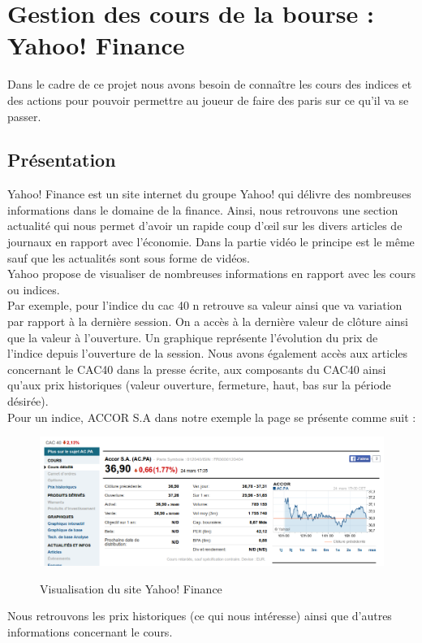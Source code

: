 \section{Gestion des cours de la bourse : Yahoo! Finance}

Dans le cadre de ce projet nous avons besoin de connaître les cours des indices et des actions pour pouvoir permettre au joueur de faire des paris sur ce qu'il va se passer.

\subsection{Présentation}

Yahoo! Finance est un site internet du groupe Yahoo! qui délivre des nombreuses informations dans le domaine de la finance. Ainsi, nous retrouvons une section actualité qui nous permet d'avoir un rapide coup d’œil sur les divers articles de journaux en rapport avec l'économie. Dans la partie vidéo le principe est le même sauf que les actualités sont sous forme de vidéos. \\

Yahoo propose de visualiser de nombreuses informations en rapport avec les cours ou indices. \\

Par exemple, pour l'indice du cac 40 n retrouve sa valeur ainsi que va variation par rapport à la dernière session. On a accès à la dernière valeur de clôture ainsi que la valeur à l'ouverture. Un graphique représente l'évolution du prix de l'indice depuis l'ouverture de la session. Nous avons également accès aux articles concernant le CAC40 dans la presse écrite, aux composants du CAC40 ainsi qu'aux prix historiques (valeur ouverture, fermeture, haut, bas sur la période désirée). \\


Pour un indice, ACCOR S.A dans notre exemple la page se présente comme suit : \\
\begin{figure}[H]
  \center
  \includegraphics[scale=0.4]{../graph/yahoo.png} \\
  \caption{Visualisation du site Yahoo! Finance}
\end{figure}
Nous retrouvons les prix historiques (ce qui nous intéresse) ainsi que d'autres informations concernant le cours. 

